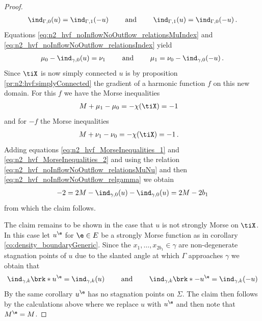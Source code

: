 \begin{proof}
  \begin{align}
    \ind_{\Gamma,0}(u)=\ind_{\Gamma,1}(-u) \qquad\text{ and }\qquad
    \ind_{\Gamma,1}(u)=\ind_{\Gamma,0}(-u)\,.\label{eq:n2_hvf_noInflowNoOutflow_relationsIndex}
  \end{align}
  Equations \eqref{eq:n2_hvf_noInflowNoOutflow_relationsMuIndex} and \eqref{eq:n2_hvf_noInflowNoOutflow_relationsIndex}
  yield 
  \begin{align}
    \mu_0-\ind_{\gamma,0}(u)=\nu_1 \qquad\text{ and }\qquad
    \mu_1=\nu_0-\ind_{\gamma,0}(-u)\,.\label{eq:n2_hvf_noInflowNoOutflow_relationsMuNu}
  \end{align}
  Since $\tiX$ is now simply connected $u$ is 
  by proposition \ref{pr:n2:hvf:simplyConnected}
  the gradient of a harmonic function $f$ on this new domain.
  For this $f$ we have the Morse inequalities
  \begin{align}
    M+\mu_1-\mu_0&=-\chi(\tiX)=-1 \label{eq:n2_hvf_MorseInequalities_1}
  \end{align}
  and for $-f$ the Morse inequalities
  \begin{align}
    M+\nu_1-\nu_0&=-\chi(\tiX)=-1\,. \label{eq:n2_hvf_MorseInequalities_2}
  \end{align}
  Adding equations \eqref{eq:n2_hvf_MorseInequalities_1} and \eqref{eq:n2_hvf_MorseInequalities_2} and using the relation
  \eqref{eq:n2_hvf_noInflowNoOutflow_relationsMuNu} and then \eqref{eq:n2_hvf_noInflowNoOutflow_relgamma} we obtain
  \begin{align*}
    -2=2M-\ind_{\gamma,0}(u)-\ind_{\gamma,0}(u)
    =2M-2b_1
  \end{align*}
  from which the claim follows.

  The claim remains to be shown in the case that $u$ is not strongly Morse on $\tiX$. In this case let
  $u^\e$ for $\e\in E$ be a strongly Morse function as in corollary \ref{co:density_boundaryGeneric}.
  Since the $x_1,\dots,x_{2b_1}\in\gamma$ are non-degenerate stagnation points of $u$
  due to the slanted angle at which
  $\Gamma$ approaches $\gamma$
  we obtain that
  \begin{align}
    \ind_{\gamma,k}\brk*{u^\e}=\ind_{\gamma,k}(u)\qquad\text{ and }\qquad 
    \ind_{\gamma,k}\brk*{-u^\e}=\ind_{\gamma,k}(-u)
    \label{eq:n3_disproof_morse_indexApprox}
  \end{align}
  By the same corollary $u^\e$ has no stagnation points on $\Sigma$.
  The claim then follows by the calculations above where we replace
  $u$ with $u^\e$ and then note that $M^\e=M$.
\end{proof}
